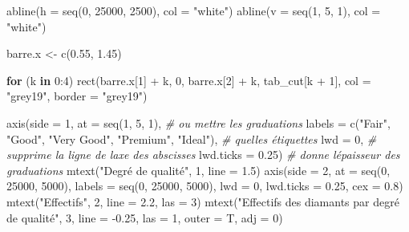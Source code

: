 \documentclass[
]{book}
\newenvironment{Shaded}{\begin{snugshade}}{\end{snugshade}}
\newcommand{\AttributeTok}[1]{\textcolor[rgb]{0.77,0.63,0.00}{#1}}
\newcommand{\CommentTok}[1]{\textcolor[rgb]{0.56,0.35,0.01}{\textit{#1}}}
\newcommand{\ControlFlowTok}[1]{\textcolor[rgb]{0.13,0.29,0.53}{\textbf{#1}}}
\newcommand{\DecValTok}[1]{\textcolor[rgb]{0.00,0.00,0.81}{#1}}
\newcommand{\FloatTok}[1]{\textcolor[rgb]{0.00,0.00,0.81}{#1}}
\newcommand{\FunctionTok}[1]{\textcolor[rgb]{0.00,0.00,0.00}{#1}}
\newcommand{\NormalTok}[1]{#1}
\newcommand{\OtherTok}[1]{\textcolor[rgb]{0.56,0.35,0.01}{#1}}
\newcommand{\SpecialCharTok}[1]{\textcolor[rgb]{0.00,0.00,0.00}{#1}}
\newcommand{\StringTok}[1]{\textcolor[rgb]{0.31,0.60,0.02}{#1}}
\theoremstyle{definition}
\theoremstyle{definition}
\theoremstyle{definition}
\theoremstyle{definition}
\theoremstyle{remark}
\begin{document}
\begin{Shaded}
\begin{Highlighting}[]
\FunctionTok{abline}\NormalTok{(}\AttributeTok{h =} \FunctionTok{seq}\NormalTok{(}\DecValTok{0}\NormalTok{, }\DecValTok{25000}\NormalTok{, }\DecValTok{2500}\NormalTok{), }\AttributeTok{col =} \StringTok{"white"}\NormalTok{)}
\FunctionTok{abline}\NormalTok{(}\AttributeTok{v =} \FunctionTok{seq}\NormalTok{(}\DecValTok{1}\NormalTok{, }\DecValTok{5}\NormalTok{, }\DecValTok{1}\NormalTok{), }\AttributeTok{col =} \StringTok{"white"}\NormalTok{)}

\NormalTok{barre.x }\OtherTok{\textless{}{-}} \FunctionTok{c}\NormalTok{(}\FloatTok{0.55}\NormalTok{, }\FloatTok{1.45}\NormalTok{)}

\ControlFlowTok{for}\NormalTok{ (k }\ControlFlowTok{in} \DecValTok{0}\SpecialCharTok{:}\DecValTok{4}\NormalTok{)}
  \FunctionTok{rect}\NormalTok{(barre.x[}\DecValTok{1}\NormalTok{] }\SpecialCharTok{+}\NormalTok{ k, }\DecValTok{0}\NormalTok{, barre.x[}\DecValTok{2}\NormalTok{] }\SpecialCharTok{+}\NormalTok{ k, tab\_cut[k }\SpecialCharTok{+} \DecValTok{1}\NormalTok{], }
       \AttributeTok{col =} \StringTok{"grey19"}\NormalTok{, }\AttributeTok{border =} \StringTok{"grey19"}\NormalTok{)}

\FunctionTok{axis}\NormalTok{(}\AttributeTok{side =} \DecValTok{1}\NormalTok{,}
     \AttributeTok{at =} \FunctionTok{seq}\NormalTok{(}\DecValTok{1}\NormalTok{, }\DecValTok{5}\NormalTok{, }\DecValTok{1}\NormalTok{),  }\CommentTok{\# ou mettre les graduations}
     \AttributeTok{labels =} \FunctionTok{c}\NormalTok{(}\StringTok{"Fair"}\NormalTok{, }\StringTok{"Good"}\NormalTok{, }\StringTok{"Very Good"}\NormalTok{, }\StringTok{"Premium"}\NormalTok{, }\StringTok{"Ideal"}\NormalTok{), }\CommentTok{\# quelles étiquettes}
     \AttributeTok{lwd =} \DecValTok{0}\NormalTok{,  }\CommentTok{\# supprime la ligne de l\textquotesingle{}axe des abscisses}
     \AttributeTok{lwd.ticks =} \FloatTok{0.25}\NormalTok{)  }\CommentTok{\# donne l\textquotesingle{}épaisseur des graduations}
\FunctionTok{mtext}\NormalTok{(}\StringTok{"Degré de qualité"}\NormalTok{, }\DecValTok{1}\NormalTok{, }\AttributeTok{line =} \FloatTok{1.5}\NormalTok{)}
\FunctionTok{axis}\NormalTok{(}\AttributeTok{side =} \DecValTok{2}\NormalTok{,}
     \AttributeTok{at =} \FunctionTok{seq}\NormalTok{(}\DecValTok{0}\NormalTok{, }\DecValTok{25000}\NormalTok{, }\DecValTok{5000}\NormalTok{),}
     \AttributeTok{labels =} \FunctionTok{seq}\NormalTok{(}\DecValTok{0}\NormalTok{, }\DecValTok{25000}\NormalTok{, }\DecValTok{5000}\NormalTok{),}
     \AttributeTok{lwd =} \DecValTok{0}\NormalTok{, }
     \AttributeTok{lwd.ticks =} \FloatTok{0.25}\NormalTok{,}
     \AttributeTok{cex =} \FloatTok{0.8}\NormalTok{)  }
\FunctionTok{mtext}\NormalTok{(}\StringTok{"Effectifs"}\NormalTok{, }\DecValTok{2}\NormalTok{, }\AttributeTok{line =} \FloatTok{2.2}\NormalTok{, }\AttributeTok{las =} \DecValTok{3}\NormalTok{)}
\FunctionTok{mtext}\NormalTok{(}\StringTok{"Effectifs des diamants par degré de qualité"}\NormalTok{, }\DecValTok{3}\NormalTok{, }
      \AttributeTok{line =} \SpecialCharTok{{-}}\FloatTok{0.25}\NormalTok{, }\AttributeTok{las =} \DecValTok{1}\NormalTok{, }\AttributeTok{outer =}\NormalTok{ T, }\AttributeTok{adj =} \DecValTok{0}\NormalTok{)}
\end{Highlighting}
\end{Shaded}
\end{document}
